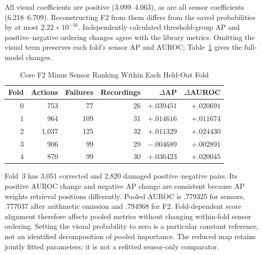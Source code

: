 All visual coefficients are positive (3.099--4.063), as are all sensor coefficients
(6.218--6.709). Reconstructing F2 from them differs from the saved probabilities by at
most $2.22\times10^{-16}$. Independently calculated threshold-group AP and
positive--negative ordering changes agree with the library metrics. Omitting the visual
term preserves each fold's sensor AP and AUROC; Table~\ref{tab:f2-fold-audit} gives the
full-model changes.

\begin{table}[htbp]
\caption{Core F2 Minus Sensor Ranking Within Each Held-Out Fold}\label{tab:f2-fold-audit}
\centering\small
\begin{tabular}{rrrrrr}\toprule
Fold & Actions & Failures & Recordings & $\Delta$AP & $\Delta$AUROC\\\midrule
0 & 753 & 77 & 26 & $+.039451$ & $+.020691$\\
1 & 964 & 109 & 31 & $+.014616$ & $+.011674$\\
2 & 1,037 & 125 & 32 & $+.011329$ & $+.024430$\\
3 & 906 & 99 & 29 & $-.004689$ & $+.002891$\\
4 & 870 & 99 & 30 & $+.036423$ & $+.020045$\\\bottomrule
\end{tabular}
\end{table}
Fold~3 has 3,051 corrected and 2,820 damaged positive--negative pairs. Its positive
AUROC change and negative AP change are consistent because AP weights retrieval
positions differently. Pooled AUROC is .779325 for sensors, .777037 after arithmetic
omission and .794968 for F2. Fold-dependent score alignment therefore affects pooled
metrics without changing within-fold sensor ordering. Setting the visual probability to
zero is a particular constant reference, not an identified decomposition of pooled
importance. The reduced map retains jointly fitted parameters; it is not a refitted
sensor-only comparator.
